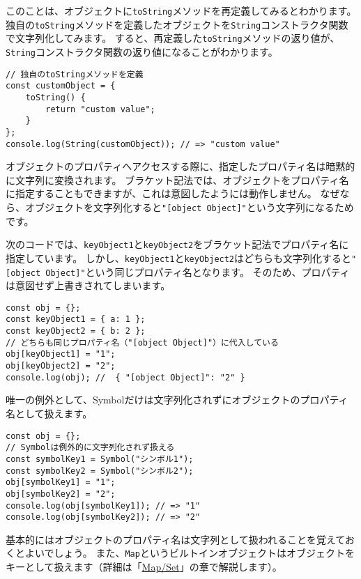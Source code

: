 このことは、オブジェクトに\texttt{toString}メソッドを再定義してみるとわかります。
独自の\texttt{toString}メソッドを定義したオブジェクトを\texttt{String}コンストラクタ関数で文字列化してみます。
すると、再定義した\texttt{toString}メソッドの返り値が、\texttt{String}コンストラクタ関数の返り値になることがわかります。

\begin{lstlisting}
// 独自のtoStringメソッドを定義
const customObject = {
    toString() {
        return "custom value";
    }
};
console.log(String(customObject)); // => "custom value"
\end{lstlisting}

\begin{tcolorbox}[title=オブジェクトのプロパティ名は文字列化される]\label{object-property-is-to-string}

オブジェクトのプロパティへアクセスする際に、指定したプロパティ名は暗黙的に文字列に変換されます。
ブラケット記法では、オブジェクトをプロパティ名に指定することもできますが、これは意図したようには動作しません。
なぜなら、オブジェクトを文字列化すると\texttt{"[object Object]"}という文字列になるためです。

次のコードでは、\texttt{keyObject1}と\texttt{keyObject2}をブラケット記法でプロパティ名に指定しています。
しかし、\texttt{keyObject1}と\texttt{keyObject2}はどちらも文字列化すると\texttt{"[object Object]"}という同じプロパティ名となります。
そのため、プロパティは意図せず上書きされてしまいます。

\begin{lstlisting}
const obj = {};
const keyObject1 = { a: 1 };
const keyObject2 = { b: 2 };
// どちらも同じプロパティ名（"[object Object]"）に代入している
obj[keyObject1] = "1";
obj[keyObject2] = "2";
console.log(obj); //  { "[object Object]": "2" }
\end{lstlisting}

唯一の例外として、Symbolだけは文字列化されずにオブジェクトのプロパティ名として扱えます。

\begin{lstlisting}
const obj = {};
// Symbolは例外的に文字列化されず扱える
const symbolKey1 = Symbol("シンボル1");
const symbolKey2 = Symbol("シンボル2");
obj[symbolKey1] = "1";
obj[symbolKey2] = "2";
console.log(obj[symbolKey1]); // => "1"
console.log(obj[symbolKey2]); // => "2"
\end{lstlisting}

基本的にはオブジェクトのプロパティ名は文字列として扱われることを覚えておくとよいでしょう。
また、\texttt{Map}というビルトインオブジェクトはオブジェクトをキーとして扱えます（詳細は「\href{../map-and-set/README.md}{Map/Set}」の章で解説します）。
\end{tcolorbox}

